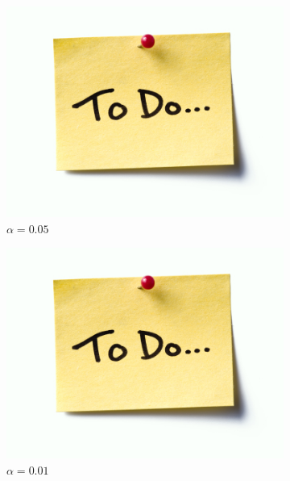 \begin{figure}
                \begin{subfigure}[b]{0.32\textwidth}
                    \centering
                    \includegraphics[width=\textwidth]{figures/todo.jpg}
                    \caption{$\alpha=0.05$}
                \end{subfigure}
                \begin{subfigure}[b]{0.32\textwidth}
                    \centering
                    \includegraphics[width=\textwidth]{figures/todo.jpg}
                    \caption{$\alpha=0.01$}
                \end{subfigure}
                \begin{subfigure}[b]{0.32\textwidth}

\end{subfigure}
\end{figure}
